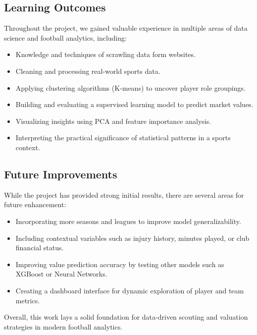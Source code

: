 \documentclass[a4paper,12pt]{article}
\begin{document}
\subsection{Learning Outcomes}
Throughout the project, we gained valuable experience in multiple areas of data science and football analytics, including:
\begin{itemize}
    \item Knowledge and techniques of scrawling data form websites.
    \item Cleaning and processing real-world sports data.
    \item Applying clustering algorithms (K-means) to uncover player role groupings.
    \item Building and evaluating a supervised learning model to predict market values.
    \item Visualizing insights using PCA and feature importance analysis.
    \item Interpreting the practical significance of statistical patterns in a sports context.
\end{itemize}

\subsection{Future Improvements}
While the project has provided strong initial results, there are several areas for future enhancement:
\begin{itemize}
    \item Incorporating more seasons and leagues to improve model generalizability.
    \item Including contextual variables such as injury history, minutes played, or club financial status.
    \item Improving value prediction accuracy by testing other models such as XGBoost or Neural Networks.
    \item Creating a dashboard interface for dynamic exploration of player and team metrics.
\end{itemize}

Overall, this work lays a solid foundation for data-driven scouting and valuation strategies in modern football analytics.
\end{document}
